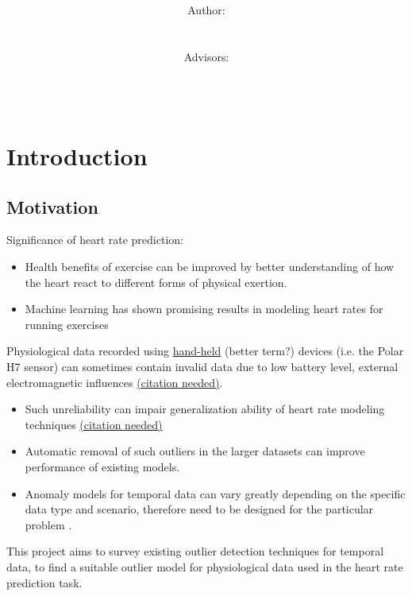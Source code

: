\documentclass[12pt]{article}
\title{\normalsize \textsc{\hmwkAuthorSchool}   %
    \\[2.0cm]                                   %
    \HRule{0.5pt} \\                            %
    \LARGE \textbf{\uppercase{\hmwkTopic}}
    \HRule{2pt} \\ [0.5cm]                      %
    \hmwkTitle\\[0.5cm]
    \normalsize \hmwkDueDate\\
}
\author{
    \\[4.0cm]
    Author:\\
    \hmwkAuthorName\\
    \ \\
    Advisors:\\
    \hmwkAdvisorFirst\\
    \hmwkAdvisorSecond\\
}
\date{}
\begin{document}
    \maketitle
    \thispagestyle{firststyle}
    \newpage

\section{Introduction}

    \subsection{Motivation}

    Significance of heart rate prediction:
    \begin{itemize}
        \item Health benefits of exercise can be improved by better understanding of how the heart react to different forms of physical exertion.
        \item Machine learning has shown promising results in modeling heart rates for running exercises \autocite{Fueller2015}
    \end{itemize}

    Physiological data recorded using \underline{hand-held} (better term?) devices (i.e. the Polar H7 sensor) can sometimes contain invalid data due to low battery level, external electromagnetic influences \underline{(citation needed)}.
    \begin{itemize}
        \item Such unreliability can impair generalization ability of heart rate modeling techniques \underline{(citation needed)}
        \item Automatic removal of such outliers in the larger datasets can improve performance of existing models.
        \item Anomaly models for temporal data can vary greatly depending on the specific data type and scenario, therefore need to be designed for the particular problem \autocite{Gupta2013}.
    \end{itemize}

    This project aims to survey existing outlier detection techniques for temporal data, to find a suitable outlier model for physiological data used in the heart rate prediction task.
\end{document}
